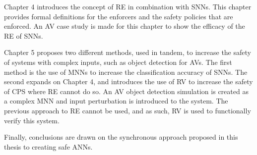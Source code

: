 Chapter 4 introduces the concept of \acf{RE} in combination with \acp{SNN}. 
This chapter provides formal definitions for the enforcers and the safety policies that are enforced.
An \acf{AV} case study is made for this chapter to show the efficacy of the \ac{RE} of \acp{SNN}.

Chapter 5 proposes two different methods, used in tandem, to increase the safety of systems with complex inputs, such as object detection for \acp{AV}.
The first method is the use of \acp{MNN} to increase the classification accuracy of \acp{SNN}.
The second expands on Chapter 4, and introduces the use of \ac{RV} to increase the safety of \ac{CPS} where \ac{RE} cannot do so.
An \ac{AV} object detection simulation is created as a complex \ac{MNN} and input perturbation is introduced to the system.
The previous approach to \ac{RE} cannot be used, and as such, \ac{RV} is used to functionally verify this system.

Finally, conclusions are drawn on the synchronous approach proposed in this thesis to creating safe \acp{ANN}.

